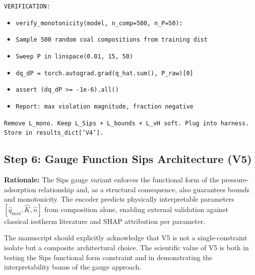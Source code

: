 \documentclass[12pt,a4paper]{article}
\begin{document}
\begin{promptbox}
\texttt{VERIFICATION:}
\begin{itemize}[noitemsep]
  \item \texttt{verify\_monotonicity(model, n\_comp=500, n\_P=50):}
  \item \texttt{Sample 500 random coal compositions from training dist}
  \item \texttt{Sweep P in linspace(0.01, 15, 50)}
  \item \texttt{dq\_dP = torch.autograd.grad(q\_hat.sum(), P\_raw)[0]}
  \item \texttt{assert (dq\_dP >= -1e-6).all()}
  \item \texttt{Report: max violation magnitude, fraction negative}
\end{itemize}

\texttt{Remove L\_mono. Keep L\_Sips + L\_bounds + L\_vH soft.
Plug into harness. Store in results\_dict['V4'].}
\end{promptbox}

\subsection{Step 6: Gauge Function Sips Architecture (V5)}

\begin{rationalebox}
\textbf{Rationale:} The Sips gauge variant enforces the functional form
of the pressure-adsorption relationship and, as a structural consequence,
also guarantees bounds and monotonicity. The encoder predicts physically
interpretable parameters $[\hat{q}_{\max}, \hat{K}, \hat{n}]$ from
composition alone, enabling external validation against classical isotherm
literature and SHAP attribution per parameter.

The manuscript should explicitly acknowledge that V5 is not a single-constraint
isolate but a composite architectural choice. The scientific value of V5
is both in testing the Sips functional form constraint and in demonstrating
the interpretability bonus of the gauge approach.
\end{rationalebox}
\end{document}
